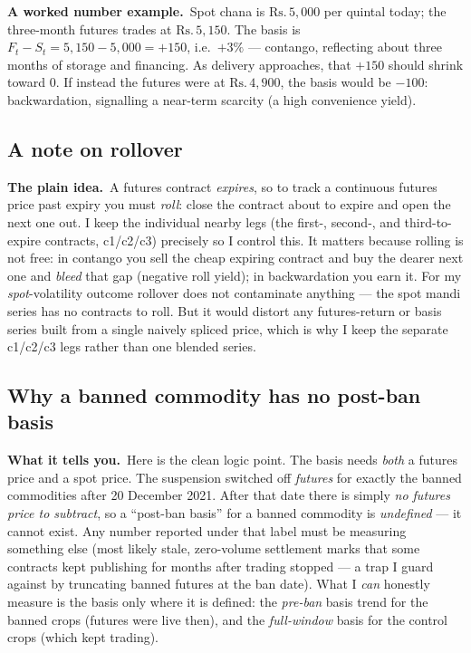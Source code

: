 \documentclass[11pt]{article}
\providecommand{\rupee}{\textrm{Rs.}}
\newcommand{\intuit}{\smallskip\noindent\textbf{The plain idea.}\ }
\newcommand{\example}{\smallskip\noindent\textbf{A worked number example.}\ }
\newcommand{\tells}{\smallskip\noindent\textbf{What it tells you.}\ }
\begin{document}
\example Spot chana is $\rupee\,5{,}000$ per quintal today; the three-month futures trades at
$\rupee\,5{,}150$. The basis is $F_t - S_t = 5{,}150 - 5{,}000 = +150$, i.e.\ $+3\%$ --- contango,
reflecting about three months of storage and financing. As delivery approaches, that $+150$ should
shrink toward $0$. If instead the futures were at $\rupee\,4{,}900$, the basis would be $-100$:
backwardation, signalling a near-term scarcity (a high convenience yield).

\subsection{A note on rollover}

\intuit A futures contract \emph{expires}, so to track a continuous futures price past expiry you
must \emph{roll}: close the contract about to expire and open the next one out. I keep the
individual nearby legs (the first-, second-, and third-to-expire contracts, c1/c2/c3) precisely so I
control this. It matters because rolling is not free: in contango you sell the cheap expiring
contract and buy the dearer next one and \emph{bleed} that gap (negative roll yield); in
backwardation you earn it. For my \emph{spot}-volatility outcome rollover does not contaminate
anything --- the spot mandi series has no contracts to roll. But it would distort any futures-return
or basis series built from a single naively spliced price, which is why I keep the separate
c1/c2/c3 legs rather than one blended series.

\subsection{Why a banned commodity has no post-ban basis}

\tells Here is the clean logic point. The basis needs \emph{both} a futures price and a spot price.
The suspension switched off \emph{futures} for exactly the banned commodities after 20 December 2021.
After that date there is simply \emph{no futures price to subtract}, so a ``post-ban basis'' for a
banned commodity is \emph{undefined} --- it cannot exist. Any number reported under that label must
be measuring something else (most likely stale, zero-volume settlement marks that some contracts
kept publishing for months after trading stopped --- a trap I guard against by truncating banned
futures at the ban date). What I \emph{can} honestly measure is the basis only where it is defined:
the \emph{pre-ban} basis trend for the banned crops (futures were live then), and the
\emph{full-window} basis for the control crops (which kept trading).
\end{document}
